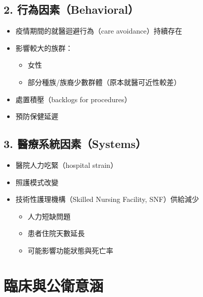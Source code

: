 \documentclass[12pt,a4paper]{article}
\begin{document}
\subsection{2. 行為因素（Behavioral）}
\begin{itemize}
    \item 疫情期間的就醫迴避行為（care avoidance）持續存在
    \item 影響較大的族群：
    \begin{itemize}
        \item 女性
        \item 部分種族/族裔少數群體（原本就醫可近性較差）
    \end{itemize}
    \item 處置積壓（backlogs for procedures）
    \item 預防保健延遲
\end{itemize}

\subsection{3. 醫療系統因素（Systems）}
\begin{itemize}
    \item 醫院人力吃緊（hospital strain）
    \item 照護模式改變
    \item 技術性護理機構（Skilled Nursing Facility, SNF）供給減少
    \begin{itemize}
        \item 人力短缺問題
        \item 患者住院天數延長
        \item 可能影響功能狀態與死亡率
    \end{itemize}
\end{itemize}

\section{臨床與公衛意涵}

\end{document}
